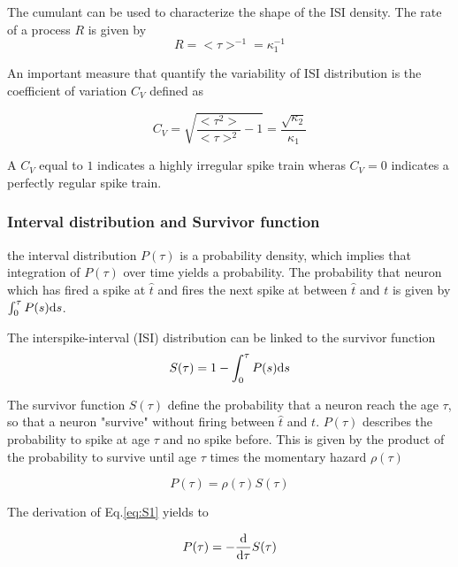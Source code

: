 \documentclass[a4paper,11pt,twoside]{article}
\def \dd  {{\rm d}}
\numberwithin{equation}{section}
\begin{document}
The cumulant can be used to characterize the shape of the ISI density. The rate of a process $R$ is given by
\begin{equation}
\label{eq:R}
R=<\tau>^{-1}=\kappa_1^{-1}
\end{equation}


An important measure that quantify the variability of ISI distribution is the coefficient of variation $C_V$ defined as


\begin{equation}
\label{eq:CV}
C_V=\sqrt{\frac{<\tau^2>}{<\tau>^2}-1}=\frac{\sqrt{\kappa_2}}{\kappa_1}
\end{equation}

A $C_V$ equal to $1$ indicates a highly irregular spike train wheras  $C_V=0$ indicates a perfectly regular spike train.


\subsubsection{Interval distribution and Survivor function}
the interval distribution $P(\tau)$ is a probability density, which implies that integration of $P(\tau)$ over time yields a probability. The probability that neuron which has fired a spike at $\hat{t}$ and fires the next spike at between $\hat{t}$ and $t$ is given by $\int_0^\tau P(s) \dd s$.

The interspike-interval (ISI) distribution can be linked to the survivor function
\begin{equation}
\label{eq:S1}
S(\tau)=1-\int_0^\tau P(s) \dd s
\end{equation}


The survivor function $S(\tau)$ define the probability that a neuron reach the age $\tau$, so that a neuron "survive" without firing between $\hat{t}$ and $t$. $P(\tau)$ describes the probability to spike at age $\tau$ and no spike before. This is given by the product of the probability to survive until age $\tau$ times the momentary hazard $\rho(\tau)$

\begin{equation}
\label{eq:P2}
P(\tau)=\rho(\tau)S(\tau)
\end{equation}

The derivation of Eq.\eqref{eq:S1} yields to 

\begin{equation}
\label{eq:P3}
P(\tau)=-\frac{\dd}{\dd \tau}S(\tau)
\end{equation}
\end{document}
